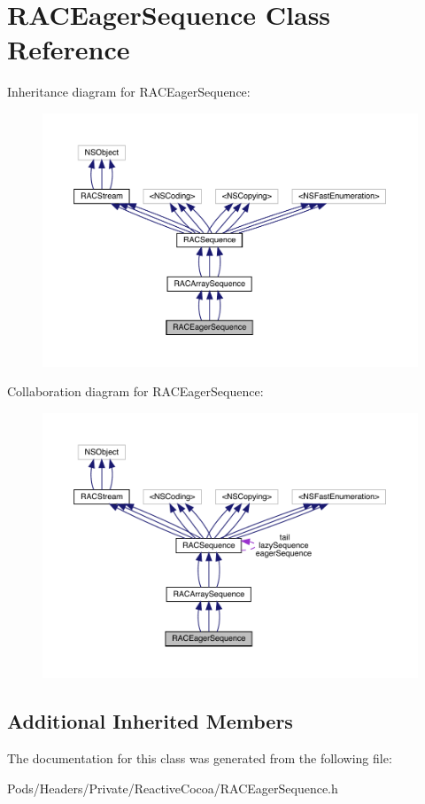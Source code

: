 \hypertarget{interface_r_a_c_eager_sequence}{}\section{R\+A\+C\+Eager\+Sequence Class Reference}
\label{interface_r_a_c_eager_sequence}


Inheritance diagram for R\+A\+C\+Eager\+Sequence\+:\nopagebreak
\begin{figure}[H]
\begin{center}
\leavevmode
\includegraphics[width=350pt]{interface_r_a_c_eager_sequence__inherit__graph}
\end{center}
\end{figure}


Collaboration diagram for R\+A\+C\+Eager\+Sequence\+:\nopagebreak
\begin{figure}[H]
\begin{center}
\leavevmode
\includegraphics[width=350pt]{interface_r_a_c_eager_sequence__coll__graph}
\end{center}
\end{figure}
\subsection*{Additional Inherited Members}


The documentation for this class was generated from the following file\+:\begin{DoxyCompactItemize}
\item 
Pods/\+Headers/\+Private/\+Reactive\+Cocoa/R\+A\+C\+Eager\+Sequence.\+h\end{DoxyCompactItemize}
